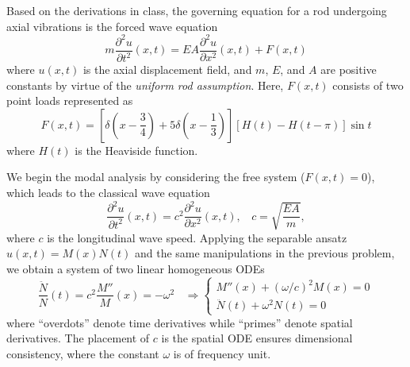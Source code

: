 Based on the derivations in class, the governing equation for a rod undergoing axial vibrations is the forced wave equation 
\begin{equation}\label{eqn:hw2_p2_eom}
    m \frac{\partial^2 u}{\partial t^2}(x, t) = E A \frac{\partial^2 u}{\partial x^2}(x, t) + F(x, t)
\end{equation}
where $u(x, t)$ is the axial displacement field, and $m$, $E$, and $A$ are positive constants by virtue of the \emph{uniform rod assumption}. 
Here, $F(x, t)$ consists of two point loads represented as 
\begin{equation}\label{eqn:hw2_p2_force}
    F(x, t) = \left[ \delta\left(x - \frac{3}{4}\right) + 5 \delta\left(x - \frac{1}{3}\right) \right] \left[H(t) - H(t - \pi)\right] \sin t
\end{equation}
where $H(t)$ is the Heaviside function.

We begin the modal analysis by considering the free system ($F(x, t) = 0$), which leads to the classical wave equation 
\begin{equation}
    \frac{\partial^2 u}{\partial t^2}(x, t) = c^2 \frac{\partial^2 u}{\partial x^2}(x, t), ~~~~ c = \sqrt{\frac{EA}{m}},
\end{equation}
where $c$ is the longitudinal wave speed. 
Applying the separable ansatz $u(x, t) = M(x)N(t)$ and the same manipulations in the previous problem, we obtain a system of two linear homogeneous ODEs 
\begin{equation}\label{eqn:hw2_p2_separated}
    \frac{\ddot{N}}{N}(t) = c^2 \frac{M''}{M}(x) = -\omega^2 ~~~~ \Rightarrow  
    \begin{cases}
        M''(x) + {(\omega /c)}^2 M(x) = 0 \\
        \ddot{N}(t) + \omega^2 N(t) = 0
    \end{cases}
\end{equation}
where ``overdots'' denote time derivatives while ``primes'' denote spatial derivatives. 
The placement of $c$ is the spatial ODE ensures dimensional consistency, where the constant $\omega$ is of frequency unit. 

